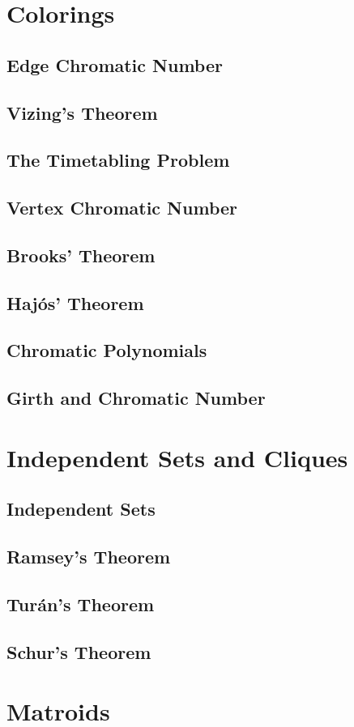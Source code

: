 	\chapter{Colorings}
		\section{Edge Chromatic Number}

		\section{Vizing's Theorem}

		\section{The Timetabling Problem}

		\section{Vertex Chromatic Number}

		\section{Brooks' Theorem}

		\section{Haj\'{o}s' Theorem}

		\section{Chromatic Polynomials}

		\section{Girth and Chromatic Number}

	\chapter{Independent Sets and Cliques}
		\section{Independent Sets}

		\section{Ramsey's Theorem}

		\section{Tur\'{a}n's Theorem}

		\section{Schur's Theorem}

	\chapter{Matroids}
